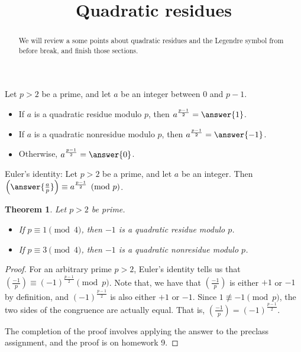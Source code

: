 \documentclass{ximera}
\title{Quadratic residues}
\theoremstyle{plain}
\newtheorem{thm}{Theorem}%
\theoremstyle{definition}
\begin{document}
  
\begin{abstract}  
We will review a some points about quadratic residues and the Legendre symbol from before break, and finish those sections.
\end{abstract}  
\maketitle  

\begin{question}
 Let $p>2$ be a prime, and let $a$ be an integer between $0$ and $p-1$.
 
\begin{itemize}
 \item If $a$ is a quadratic residue modulo $p$, then $a^{\frac{p-1}{2}}=\answer{1}
 $.
 \item If $a$ is a quadratic nonresidue modulo $p$, then $a^{\frac{p-1}{2}}=\answer{-1}
 $.
 \item Otherwise, $a^{\frac{p-1}{2}}=\answer{0}
 $.
\end{itemize}
\end{question}

\begin{question}
 Euler's identity:  Let $p>2$ be a prime, and let $a$ be an integer. Then $\left(\answer{\frac{a}{p}}
 \right)\equiv a^{\frac{p-1}{2}} \pmod p$.
\end{question}

\begin{thm}
 Let $p>2$ be prime.
\begin{itemize}
 \item If $p\equiv 1 \pmod 4$, then $-1$ is a quadratic residue modulo $p$.
 \item If $p\equiv 3 \pmod 4$, then $-1$ is a quadratic nonresidue modulo $p$.
\end{itemize}
\end{thm}
\begin{proof}
 For an arbitrary prime $p>2$, Euler's identity tells us that $\left(\frac{-1}{p}\right)\equiv (-1)^{\frac{p-1}{2}} \pmod p$. Note that, we have that $\left(\frac{-1}{p}\right)$ is either $+1$ or $-1$ by definition, and $(-1)^{\frac{p-1}{2}}$ is also either $+1$ or $-1$. Since $1\not\equiv -1 \pmod p$, the two sides of the congruence are actually equal. That is, $\left(\frac{-1}{p}\right)= (-1)^{\frac{p-1}{2}} $.
 
 The completion of the proof involves applying the answer to the preclass assignment, and the proof is on homework 9.
 \end{proof}
 
\end{document}

